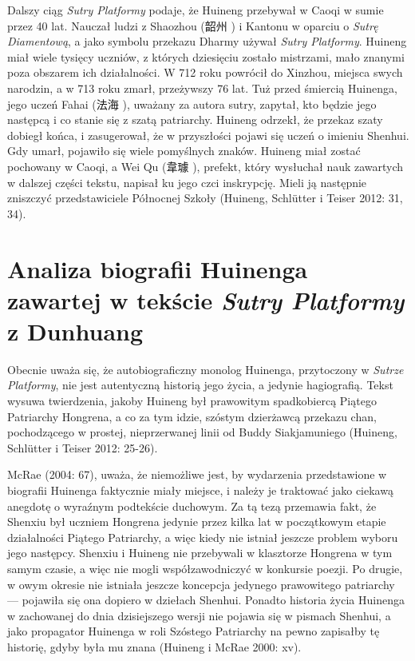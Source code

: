 Dalszy ciąg \textit{Sutry Platformy} podaje, że Huineng przebywał w Caoqi w sumie przez 40 lat.
Nauczał ludzi z Shaozhou (韶州 ) i Kantonu w oparciu o \textit{Sutrę Diamentową}, a jako symbolu przekazu Dharmy używał \textit{Sutry Platformy}. Huineng miał wiele tysięcy uczniów, z których dziesięciu zostało mistrzami, mało znanymi poza obszarem ich działalności.
W 712 roku powrócił do Xinzhou, miejsca swych narodzin, a w 713 roku zmarł, przeżywszy 76 lat.
Tuż przed śmiercią Huinenga, jego uczeń Fahai (法海 ), uważany za autora sutry, zapytał, kto będzie jego następcą i co stanie się z szatą patriarchy.
Huineng odrzekł, że przekaz szaty dobiegł końca, i zasugerował, że w przyszłości pojawi się uczeń o imieniu Shenhui.
Gdy umarł, pojawiło się wiele pomyślnych znaków.
Huineng miał zostać pochowany w Caoqi, a Wei Qu (韋璩 ), prefekt, który wysłuchał nauk zawartych w dalszej części tekstu, napisał ku jego czci inskrypcję. Mieli ją następnie zniszczyć przedstawiciele Północnej Szkoły
(Huineng, Schlütter i Teiser 2012: 31, 34).

\section{Analiza biografii Huinenga zawartej w tekście \textit{Sutry Platformy} z Dunhuang}
Obecnie uważa się, że autobiograficzny monolog Huinenga, przytoczony w \textit{Sutrze Platformy}, nie jest autentyczną historią jego życia, a jedynie hagiografią.
Tekst wysuwa twierdzenia, jakoby Huineng był prawowitym spadkobiercą Piątego Patriarchy Hongrena, a co za tym idzie, szóstym dzierżawcą przekazu chan, pochodzącego w prostej, nieprzerwanej linii od Buddy Siakjamuniego
(Huineng, Schlütter i Teiser 2012: 25-26).

McRae (2004: 67), uważa, że niemożliwe jest, by wydarzenia przedstawione w biografii Huinenga faktycznie miały miejsce, i należy je traktować jako ciekawą anegdotę o wyraźnym podtekście duchowym.
Za tą tezą przemawia fakt, że Shenxiu był uczniem Hongrena jedynie przez kilka lat w początkowym etapie działalności Piątego Patriarchy, a więc kiedy nie istniał jeszcze problem wyboru jego następcy. Shenxiu i Huineng nie przebywali w klasztorze Hongrena w tym samym czasie, a więc nie mogli współzawodniczyć w konkursie poezji.
Po drugie, w owym okresie nie istniała jeszcze koncepcja jedynego prawowitego patriarchy --- pojawiła się ona dopiero w dziełach Shenhui. Ponadto historia życia Huinenga w zachowanej do dnia dzisiejszego wersji nie pojawia się w pismach Shenhui, a jako propagator Huinenga w roli Szóstego Patriarchy na pewno zapisałby tę historię, gdyby była mu znana
(Huineng i McRae 2000: xv).


